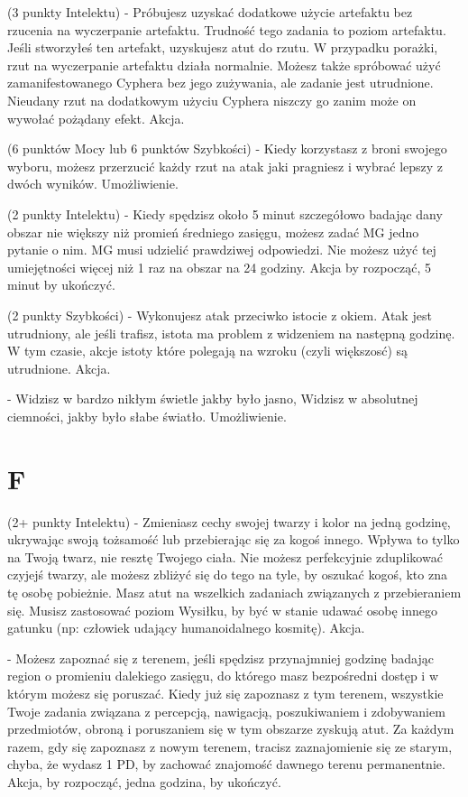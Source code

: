 { (3 punkty Intelektu) - Próbujesz uzyskać dodatkowe użycie artefaktu bez rzucenia na wyczerpanie artefaktu. Trudność tego zadania to poziom artefaktu. Jeśli stworzyłeś ten artefakt, uzyskujesz atut do rzutu. W przypadku porażki, rzut na wyczerpanie artefaktu działa normalnie. Możesz także spróbować użyć zamanifestowanego Cyphera bez jego zużywania, ale zadanie jest utrudnione. Nieudany rzut na dodatkowym użyciu Cyphera niszczy go zanim może on wywołać pożądany efekt. Akcja. 

 (6 punktów Mocy lub 6 punktów Szybkości) - Kiedy korzystasz z broni swojego wyboru, możesz przerzucić każdy rzut na atak jaki pragniesz i wybrać lepszy z dwóch wyników. Umożliwienie. 

 (2 punkty Intelektu) - Kiedy spędzisz około 5 minut szczegółowo badając dany obszar nie większy niż promień średniego zasięgu, możesz zadać MG jedno pytanie o nim. MG musi udzielić prawdziwej odpowiedzi. Nie możesz użyć tej umiejętności więcej niż 1 raz na obszar na 24 godziny. Akcja by rozpocząć, 5 minut by ukończyć.

 (2 punkty Szybkości) - Wykonujesz atak przeciwko istocie z okiem. Atak jest utrudniony, ale jeśli trafisz, istota ma problem z widzeniem na następną godzinę. W tym czasie, akcje istoty które polegają na wzroku (czyli większosć) są utrudnione. Akcja. 

 - Widzisz w bardzo nikłym świetle jakby było jasno, Widzisz w absolutnej ciemności, jakby było słabe światło. Umożliwienie.

\section{F}

 (2+ punkty Intelektu) - Zmieniasz cechy swojej twarzy i kolor na jedną godzinę, ukrywając swoją tożsamość lub przebierając się za kogoś innego. Wpływa to tylko na Twoją twarz, nie resztę Twojego ciała. Nie możesz perfekcyjnie zduplikować czyjejś twarzy, ale możesz zbliżyć się do tego na tyle, by oszukać kogoś, kto zna tę osobę pobieżnie. Masz atut na wszelkich zadaniach związanych z przebieraniem się. Musisz zastosować poziom Wysiłku, by być w stanie udawać osobę innego gatunku (np: człowiek udający humanoidalnego kosmitę). Akcja.

 - Możesz zapoznać się z terenem, jeśli spędzisz przynajmniej godzinę badając region o promieniu dalekiego zasięgu, do którego masz bezpośredni dostęp i w którym możesz się poruszać. Kiedy już się zapoznasz z tym terenem, wszystkie Twoje zadania związana z percepcją, nawigacją, poszukiwaniem i zdobywaniem przedmiotów, obroną i poruszaniem się w tym obszarze zyskują atut. Za każdym razem, gdy się zapoznasz z nowym terenem, tracisz zaznajomienie się ze starym, chyba, że wydasz 1 PD, by zachować znajomość dawnego terenu permanentnie. Akcja, by rozpocząć, jedna godzina, by ukończyć.

}
